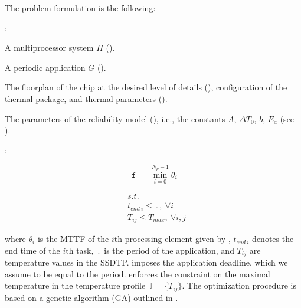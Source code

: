 The problem formulation is the following:

:
\begin{ilist}
  \item A multiprocessor system $\Pi$ ().
  \item A periodic application $G$ ().
  \item The floorplan of the chip at the desired level of details (), configuration of the thermal package, and thermal parameters ().
  \item The parameters of the reliability model (), i.e., the constants $A$, $\Delta T_0$, $b$, $E_a$ (see ).
\end{ilist}

:\vspace{-5pt}

\begin{minipage}{0.35\linewidth}
  \begin{equation} \label{eq:fitness-function}
    \mttf = \min_{i = 0}^{N_p - 1} \theta_i
  \end{equation}
\end{minipage}
\begin{minipage}{0.6\linewidth}
  \begin{align}
    & s.t. \nonumber \\
    & t_{end \: i} \leq \period, \: \forall i \label{eq:deadline} \\
    & T_{ij} \leq T_{max}, \: \forall i, j \label{eq:t-max}
  \end{align}
\end{minipage}\vspace{5pt}
where $\theta_i$ is the MTTF of the $i$th processing element given by , $t_{end \: i}$ denotes the end time of the $i$th task, $\period$ is the period of the application, and $T_{ij}$ are temperature values in the SSDTP.  imposes the application deadline, which we assume to be equal to the period.  enforces the constraint on the maximal temperature in the temperature profile $\mathbb{T} = \{ T_{ij} \}$. The optimization procedure is based on a genetic algorithm (GA) outlined in .
